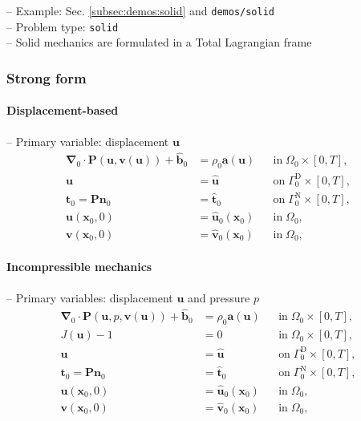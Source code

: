 \documentclass[a4paper,12pt]{report}
\newcommand{\bs}[1]{\boldsymbol{#1}}
\newcommand{\Om}{\mathit{\Omega}}
\newcommand{\Gm}{\mathit{\Gamma}}
\begin{document}
-- Example: Sec. \ref{subsec:demos:solid} and \verb"demos/solid"\\

-- Problem type: \verb.solid.\\

-- Solid mechanics are formulated in a Total Lagrangian frame

\subsubsection{Strong form}

\paragraph{Displacement-based}
-- Primary variable: displacement $\bs{u}$
\begin{align}
\bs{\nabla}_{0} \cdot \bs{P}(\bs{u},\bs{v}(\bs{u})) + \hat{\bs{b}}_{0} &= \rho_{0} \bs{a}(\bs{u}) &&\text{in} \; \mathit{\Omega}_{0} \times [0, T], \label{eq:divP} \\
\bs{u} &= \hat{\bs{u}} &&\text{on} \; \mathit{\Gamma}_{0}^{\mathrm{D}} \times [0, T], \label{eq:bc_u}\\
\bs{t}_{0} = \bs{P}\bs{n}_{0} &= \hat{\bs{t}}_{0} &&\text{on} \; \mathit{\Gamma}_{0}^{\mathrm{N}} \times [0, T], \label{eq:bc_N}\\
\bs{u}(\bs{x}_{0},0) &= \hat{\bs{u}}_{0}(\bs{x}_{0}) &&\text{in} \; \mathit{\Omega}_{0}, \label{eq:ini_u}\\
\bs{v}(\bs{x}_{0},0) &= \hat{\bs{v}}_{0}(\bs{x}_{0}) &&\text{in} \; \mathit{\Omega}_{0}, \label{eq:ini_v}
\end{align}

\paragraph{Incompressible mechanics}
-- Primary variables: displacement $\bs{u}$ and pressure $p$
\begin{align}
\bs{\nabla}_{0} \cdot \bs{P}(\bs{u},p,\bs{v}(\bs{u})) + \hat{\bs{b}}_{0} &= \rho_{0} \bs{a}(\bs{u}) &&\text{in} \; \mathit{\Omega}_{0} \times [0, T], \label{eq:divP_inc} \\
J(\bs{u})-1 &= 0 &&\text{in} \; \mathit{\Omega}_{0} \times [0, T], \label{eq:J} \\
\bs{u} &= \hat{\bs{u}} &&\text{on} \; \mathit{\Gamma}_{0}^{\mathrm{D}} \times [0, T], \label{eq:bc_u_inc}\\
\bs{t}_{0} = \bs{P}\bs{n}_{0} &= \hat{\bs{t}}_{0} &&\text{on} \; \mathit{\Gm}_{0}^{\mathrm{N}} \times [0, T], \label{eq:bc_N_inc}\\
\bs{u}(\bs{x}_{0},0) &= \hat{\bs{u}}_{0}(\bs{x}_{0}) &&\text{in} \; \mathit{\Om}_{0}, \label{eq:ini_u_inc}\\
\bs{v}(\bs{x}_{0},0) &= \hat{\bs{v}}_{0}(\bs{x}_{0}) &&\text{in} \; \mathit{\Om}_{0}, \label{eq:ini_v_inc}
\end{align}
\end{document}
